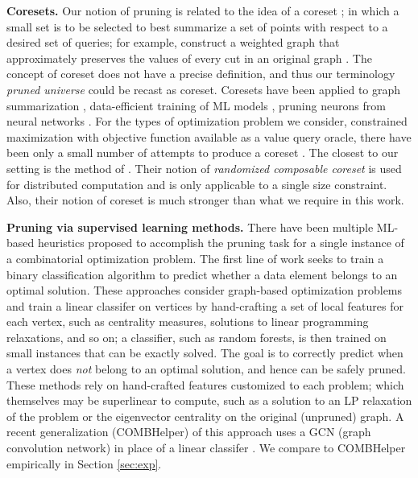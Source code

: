 \textbf{Coresets.}
Our notion of pruning is related to the
idea of a coreset \citep{Braverman2022, Feldman2020b, Indyk2014, Kogan2015, Liu2019, Mirrokni2015, Mirzasoleiman2020, Tukan2020, Tukan2022, Yang2023a, Zhang2022e}; in which
a small set is to be selected to
best summarize a set of
points with respect to a desired
set of queries; for example,
construct a weighted graph that
approximately preserves the values
of every cut in an original graph
\citep{Kogan2015}. 
The concept of coreset does not
have a precise definition,
and thus our 
terminology
\textit{pruned universe}
could be
recast as coreset. 
Coresets have been applied
to \eg graph summarization \citep{Liu2019},
data-efficient training of ML models \citep{Mirzasoleiman2020,Yang2023a},
pruning neurons from neural networks \citep{Tukan2022}.
For the types of optimization
problem we consider, \ie
constrained maximization with objective
function available as a value query oracle,
there have been only a small
number of attempts to produce a coreset
\citep{Indyk2014,Mirrokni2015}.
The closest to our setting
is the method of \citet{Mirrokni2015}.
Their notion of \textit{randomized
  composable coreset}
is used for distributed computation
and is only applicable to
a single size constraint. 
Also, their notion of coreset
is much stronger than what we require
in this work. 

\textbf{Pruning via supervised learning methods.}
There have been multiple ML-based heuristics
proposed to accomplish the pruning task
for a single instance of a combinatorial optimization
problem.
The first line of work \citep{Lauri2019, Lauri2023, Sun2021b, Sun2021c, Zhang2022b}
seeks to train a binary classification algorithm to predict
whether a data element belongs to an optimal solution.
These approaches
consider graph-based optimization problems and
train a linear classifer on vertices
by hand-crafting a set of local features for each vertex,
such as centrality measures,
solutions to linear programming relaxations, and so on; a classifier, such as random forests, is then trained on small instances that can be exactly solved. The goal is to correctly predict when a vertex does \textit{not} belong to an optimal solution,
and hence can be safely pruned. 
These methods rely on hand-crafted features
customized to each problem; which themselves may
be superlinear to compute, such as a
solution to an LP relaxation of the problem
or the eigenvector centrality on the original (unpruned)
graph.
A recent generalization (COMBHelper) of this approach uses a GCN (graph convolution network)
in place of a linear classifer \citep{Tian2024}.
We compare to COMBHelper empirically in Section \ref{sec:exp}. 

